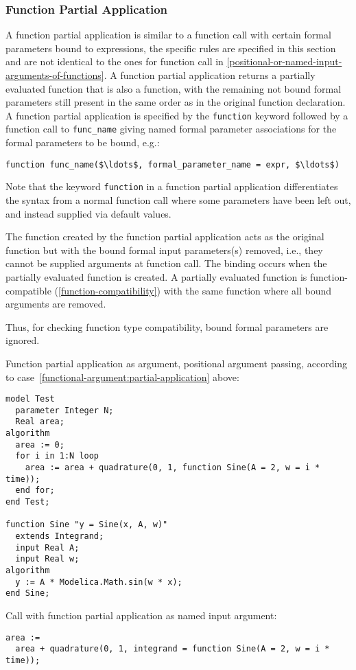 \subsubsection{Function Partial Application}\label{function-partial-application}

A function partial application is similar to a function call with certain formal parameters bound to expressions, the specific rules are specified in this section and are not identical to the ones for function call in \cref{positional-or-named-input-arguments-of-functions}.
A function partial application returns a partially evaluated function that is also a function, with the remaining not bound formal parameters still present in the same order as in the original function declaration.
A function partial application is specified by the \lstinline!function! keyword followed by a function call to \lstinline!func_name! giving named formal parameter associations for the formal parameters to be bound, e.g.:
\begin{lstlisting}[language=modelica]
function func_name($\ldots$, formal_parameter_name = expr, $\ldots$)
\end{lstlisting}

\begin{nonnormative}
Note that the keyword \lstinline!function! in a function partial application differentiates the syntax from a normal function call where some parameters have been left out, and instead supplied via default values.
\end{nonnormative}

The function created by the function partial application acts as the original function but with the bound formal input parameters(s) removed, i.e., they cannot be supplied arguments at function call.
The binding occurs when the partially evaluated function is created.
A partially evaluated function is function-compatible (\cref{function-compatibility}) with the same function where all bound arguments are removed.

\begin{nonnormative}
Thus, for checking function type compatibility, bound formal parameters are ignored.
\end{nonnormative}

\begin{example}
Function partial application as argument, positional argument passing, according to case~\ref{functional-argument:partial-application} above:
\begin{lstlisting}[language=modelica]
model Test
  parameter Integer N;
  Real area;
algorithm
  area := 0;
  for i in 1:N loop
    area := area + quadrature(0, 1, function Sine(A = 2, w = i * time));
  end for;
end Test;

function Sine "y = Sine(x, A, w)"
  extends Integrand;
  input Real A;
  input Real w;
algorithm
  y := A * Modelica.Math.sin(w * x);
end Sine;
\end{lstlisting}
Call with function partial application as named input argument:
\begin{lstlisting}[language=modelica]
area :=
  area + quadrature(0, 1, integrand = function Sine(A = 2, w = i * time));
\end{lstlisting}
\end{example}


